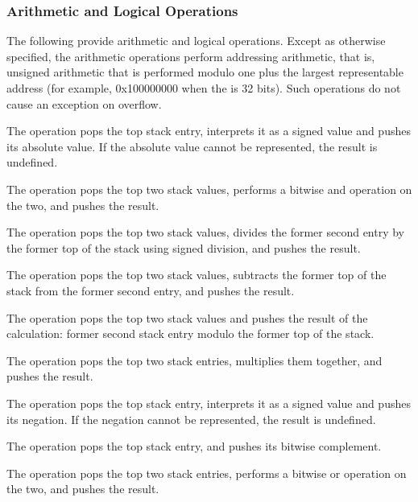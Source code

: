 \subsubsection{Arithmetic and Logical Operations}
The 
following 
provide arithmetic and logical operations. Except
as otherwise specified, the arithmetic operations perform
addressing arithmetic, that is, unsigned arithmetic that is
performed modulo one plus the largest representable address
(for example, 0x100000000 when the 
 is 32 bits). 
Such operations do not cause an exception on overflow.

\begin{enumerate}[1. ]
\itembfnl{\DWOPabsTARG}
The \DWOPabsTARG{} operation pops the top stack entry, interprets
it as a signed value and pushes its absolute value. If the
absolute value cannot be represented, the result is undefined.

\itembfnl{\DWOPandTARG}
The \DWOPandTARG{} operation pops the top two stack values, performs
a bitwise and operation on the two, and pushes the result.

\itembfnl{\DWOPdivTARG}
The \DWOPdivTARG{} operation pops the top two stack values, divides the former second entry by
the former top of the stack using signed division, and pushes the result.

\itembfnl{\DWOPminusTARG}
The \DWOPminusTARG{} operation pops the top two stack values, subtracts the former top of the
stack from the former second entry, and pushes the result.

\itembfnl{\DWOPmodTARG}
The \DWOPmodTARG{} operation pops the top two stack values and pushes the result of the
calculation: former second stack entry modulo the former top of the stack.

\itembfnl{\DWOPmulTARG}
The \DWOPmulTARG{} operation pops the top two stack entries, multiplies them together, and
pushes the result.

\itembfnl{\DWOPnegTARG}
The \DWOPnegTARG{} operation pops the top stack entry, interprets
it as a signed value and pushes its negation. If the negation
cannot be represented, the result is undefined.

\itembfnl{\DWOPnotTARG}
The \DWOPnotTARG{} operation pops the top stack entry, and pushes
its bitwise complement.

\itembfnl{\DWOPorTARG}
The \DWOPorTARG{} operation pops the top two stack entries, performs
a bitwise or operation on the two, and pushes the result.


\end{enumerate}
